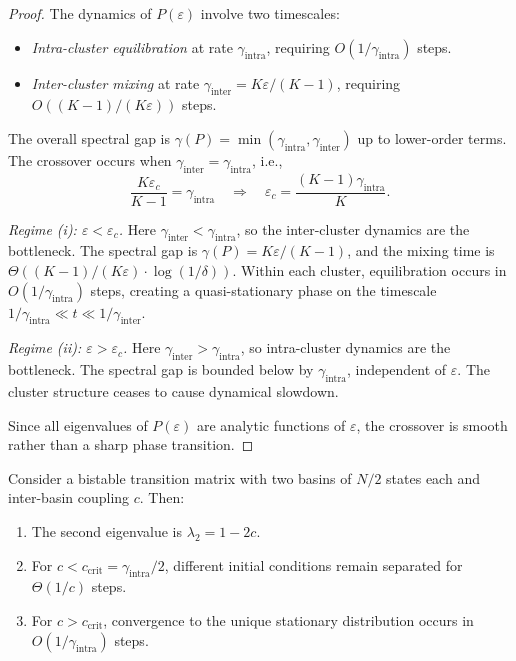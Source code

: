 \begin{proof}
The dynamics of $P(\varepsilon)$ involve two timescales:
\begin{itemize}[leftmargin=*]
\item \emph{Intra-cluster equilibration} at rate $\gamma_{\mathrm{intra}}$,
  requiring $O(1/\gamma_{\mathrm{intra}})$ steps.
\item \emph{Inter-cluster mixing} at rate $\gamma_{\mathrm{inter}} = K\varepsilon/(K-1)$,
  requiring $O((K-1)/(K\varepsilon))$ steps.
\end{itemize}

The overall spectral gap is $\gamma(P) = \min(\gamma_{\mathrm{intra}},
\gamma_{\mathrm{inter}})$ up to lower-order terms. The crossover occurs when
$\gamma_{\mathrm{inter}} = \gamma_{\mathrm{intra}}$, i.e.,
\[
  \frac{K\varepsilon_c}{K - 1} = \gamma_{\mathrm{intra}}
  \quad \Longrightarrow \quad
  \varepsilon_c = \frac{(K-1)\gamma_{\mathrm{intra}}}{K}.
\]

\emph{Regime (i): $\varepsilon < \varepsilon_c$.} Here
$\gamma_{\mathrm{inter}} < \gamma_{\mathrm{intra}}$, so the inter-cluster
dynamics are the bottleneck. The spectral gap is
$\gamma(P) = K\varepsilon/(K-1)$, and the mixing time is
$\Theta((K-1)/(K\varepsilon) \cdot \log(1/\delta))$. Within each cluster,
equilibration occurs in $O(1/\gamma_{\mathrm{intra}})$ steps, creating a
quasi-stationary phase on the timescale
$1/\gamma_{\mathrm{intra}} \ll t \ll 1/\gamma_{\mathrm{inter}}$.

\emph{Regime (ii): $\varepsilon > \varepsilon_c$.} Here
$\gamma_{\mathrm{inter}} > \gamma_{\mathrm{intra}}$, so intra-cluster dynamics
are the bottleneck. The spectral gap is bounded below by
$\gamma_{\mathrm{intra}}$, independent of $\varepsilon$. The cluster structure
ceases to cause dynamical slowdown.

Since all eigenvalues of $P(\varepsilon)$ are analytic functions of
$\varepsilon$, the crossover is smooth rather than a sharp phase transition.
\end{proof}

\begin{proposition}\label{prop:bistable}
Consider a bistable transition matrix with two basins of $N/2$ states each
and inter-basin coupling $c$. Then:
\begin{enumerate}[label=(\roman*)]
\item The second eigenvalue is $\lambda_2 = 1 - 2c$.
\item For $c < c_{\mathrm{crit}} = \gamma_{\mathrm{intra}}/2$, different
  initial conditions remain separated for $\Theta(1/c)$ steps.
\item For $c > c_{\mathrm{crit}}$, convergence to the unique stationary
  distribution occurs in $O(1/\gamma_{\mathrm{intra}})$ steps.
\end{enumerate}
\end{proposition}

